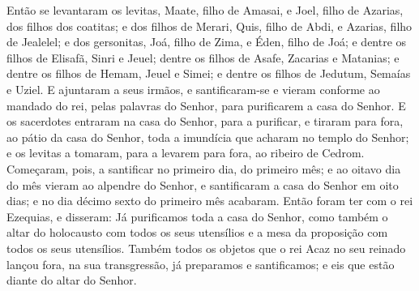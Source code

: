Então se levantaram os levitas, Maate, filho de Amasai, e Joel,
filho de Azarias, dos filhos dos coatitas; e dos filhos de Merari,
Quis, filho de Abdi, e Azarias, filho de Jealelel; e dos gersonitas,
Joá, filho de Zima, e Éden, filho de Joá; e dentre os filhos
de Elisafã, Sinri e Jeuel; dentre os filhos de Asafe, Zacarias e
Matanias; e dentre os filhos de Hemam, Jeuel e Simei; e
dentre os filhos de Jedutum, Semaías e Uziel. E ajuntaram a
seus irmãos, e santificaram-se e vieram conforme ao mandado do rei,
pelas palavras do Senhor, para purificarem a casa do Senhor.
E os sacerdotes entraram na casa do Senhor, para a purificar,
e tiraram para fora, ao pátio da casa do Senhor, toda a imundícia
que acharam no templo do Senhor; e os levitas a tomaram, para a
levarem para fora, ao ribeiro de Cedrom. Começaram, pois, a
santificar no primeiro dia, do primeiro mês; e ao oitavo dia do mês
vieram ao alpendre do Senhor, e santificaram a casa do Senhor em
oito dias; e no dia décimo sexto do primeiro mês acabaram.
Então foram ter com o rei Ezequias, e disseram: Já
purificamos toda a casa do Senhor, como também o altar do holocausto
com todos os seus utensílios e a mesa da proposição com todos os
seus utensílios. Também todos os objetos que o rei Acaz no
seu reinado lançou fora, na sua transgressão, já preparamos e
santificamos; e eis que estão diante do altar do Senhor.

